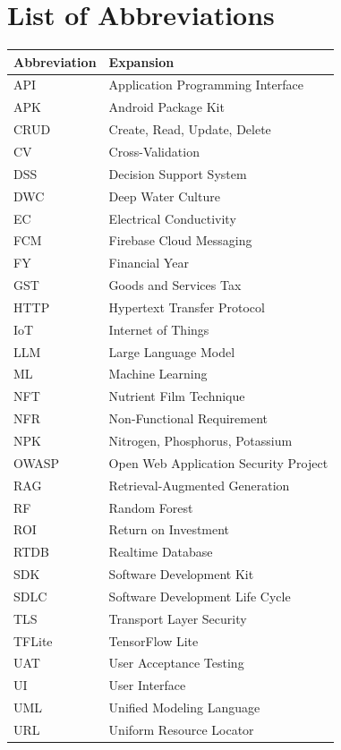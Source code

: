 \chapter*{List of Abbreviations}
\begin{tabular}{@{}ll@{}}
\toprule
\textbf{Abbreviation} & \textbf{Expansion} \\
\midrule
API & Application Programming Interface \\
APK & Android Package Kit \\
CRUD & Create, Read, Update, Delete \\
CV & Cross-Validation \\
DSS & Decision Support System \\
DWC & Deep Water Culture \\
EC & Electrical Conductivity \\
FCM & Firebase Cloud Messaging \\
FY & Financial Year \\
GST & Goods and Services Tax \\
HTTP & Hypertext Transfer Protocol \\
IoT & Internet of Things \\
LLM & Large Language Model \\
ML & Machine Learning \\
NFT & Nutrient Film Technique \\
NFR & Non-Functional Requirement \\
NPK & Nitrogen, Phosphorus, Potassium \\
OWASP & Open Web Application Security Project \\
RAG & Retrieval-Augmented Generation \\
RF & Random Forest \\
ROI & Return on Investment \\
RTDB & Realtime Database \\
SDK & Software Development Kit \\
SDLC & Software Development Life Cycle \\
TLS & Transport Layer Security \\
TFLite & TensorFlow Lite \\
UAT & User Acceptance Testing \\
UI & User Interface \\
UML & Unified Modeling Language \\
URL & Uniform Resource Locator \\
\bottomrule
\end{tabular}
